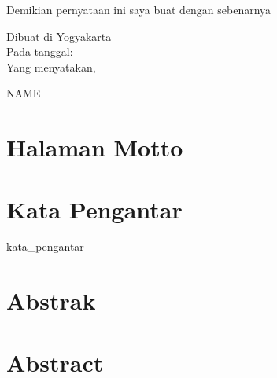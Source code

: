 \documentclass[oneside,12pt, a4paper]{book}
\def\author{NAME}
\numberwithin{equation}{chapter}
\begin{document}
\vspace{2cm}
\noindent Demikian pernyataan ini saya buat dengan sebenarnya\\
\vspace{1cm}


\noindent Dibuat di Yogyakarta\\
\noindent Pada tanggal: \\
Yang menyatakan,\\
\vspace{4cm}


\noindent \author
\clearpage
\chapter{Halaman Motto}

\vspace{5cm}

\begin{center}

\end{center}

\clearpage

\vspace{30pt}
\chapter{Kata Pengantar}
\vspace{10pt}

\begin{doublespace}

{kata_pengantar}
	
\end{doublespace}



\clearpage
\chapter{\centering Abstrak}
\begin{quotation}
\end{quotation}


\clearpage
\chapter{\centering Abstract}
\begin{quotation}
\end{quotation}
\end{document}
